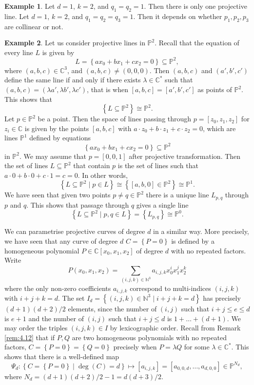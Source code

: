 \documentclass{article}
\newcommand{\N}{\mathbb{N}}
\newcommand{\C}{\mathbb{C}}
\renewcommand{\P}{\mathbb{P}}
\newcommand{\rb}[1]{\left( #1 \right)}
\renewcommand{\sb}[1]{\left[ #1 \right]}
\newcommand{\cb}[1]{\left\{ #1 \right\}}
\theoremstyle{definition}\newtheorem{definition}{Definition}[section]
\theoremstyle{definition}\newtheorem{notation}[definition]{Notation}
\theoremstyle{definition}\newtheorem{remark}[definition]{Remark}
\theoremstyle{definition}\newtheorem{example}[definition]{Example}
\theoremstyle{definition}\newtheorem{fact}{Fact}
\theoremstyle{definition}\newtheorem{exercise}{Exercise}
\begin{document}
\begin{example}
Let $ d = 1 $, $ k = 2 $, and $ q_1 = q_2 = 1 $. Then there is only one projective line. Let $ d = 1 $, $ k = 2 $, and $ q_1 = q_2 = q_3 = 1 $. Then it depends on whether $ p_1, p_2, p_3 $ are collinear or not.
\end{example}

\begin{example}
Let us consider projective lines in $ \P^2 $. Recall that the equation of every line $ L $ is given by
$$ L = \cb{ax_0 + bx_1 + cx_2 = 0} \subseteq \P^2, $$
where $ \rb{a, b, c} \in \C^3 $, and $ \rb{a, b, c} \ne \rb{0, 0, 0} $. Then $ \rb{a, b, c} $ and $ \rb{a', b', c'} $ define the same line if and only if there exists $ \lambda \in \C^* $ such that $ \rb{a, b, c} = \rb{\lambda a', \lambda b', \lambda c'} $, that is when $ \sb{a, b, c} = \sb{a', b', c'} $ as points of $ \P^2 $. This shows that
$$ \cb{L \subseteq \P^2} \cong \P^2. $$
Let $ p \in \P^2 $ be a point. Then the space of lines passing through $ p = \sb{z_0, z_1, z_2} $ for $ z_i \in \C $ is given by the points $ \sb{a, b, c} $ with $ a \cdot z_0 + b \cdot z_1 + c \cdot z_2 = 0 $, which are lines $ \P^1 $ defined by equations
$$ \cb{ax_0 + bx_1 + cx_2 = 0} \subseteq \P^2 $$
in $ \P^2 $. We may assume that $ p = \sb{0, 0, 1} $ after projective transformation. Then the set of lines $ L \subseteq \P^2 $ that contain $ p $ is the set of lines such that $ a \cdot 0 + b \cdot 0 + c \cdot 1 = c = 0 $. In other words,
$$ \cb{L \subseteq \P^2 \mid p \in L} \cong \cb{\sb{a, b, 0} \in \P^2} \cong \P^1. $$
We have seen that given two points $ p \ne q \in \P^2 $ there is a unique line $ L_{p, q} $ through $ p $ and $ q $. This shows that passage through $ q $ gives a single line
$$ \cb{L \subseteq \P^2 \mid p, q \in L} = \cb{L_{p, q}} \cong \P^0. $$
\end{example}

We can parametrise projective curves of degree $ d $ in a similar way. More precisely, we have seen that any curve of degree $ d $ $ C = \cb{P = 0} $ is defined by a homogeneous polynomial $ P \in \C\sb{x_0, x_1, x_2} $ of degree $ d $ with no repeated factors. Write
$$ P\rb{x_0, x_1, x_2} = \sum_{\rb{i, j, k} \in \N^3} a_{i, j, k}x_0^ix_1^jx_2^k $$
where the only non-zero coefficients $ a_{i, j, k} $ correspond to multi-indices $ \rb{i, j, k} $ with $ i + j + k = d $. The set $ I_d = \cb{\rb{i, j, k} \in \N^3 \mid i + j + k = d} $ has precisely $ \rb{d + 1}\rb{d + 2} / 2 $ elements, since the number of $ \rb{i, j} $ such that $ i + j \le e \le d $ is $ e + 1 $ and the number of $ \rb{i, j} $ such that $ i + j \le d $ is $ 1 + \dots + \rb{d + 1} $. We may order the triples $ \rb{i, j, k} \in I $ by lexicographic order. Recall from Remark \ref{rem:4.12} that if $ P, Q $ are two homogeneous polynomials with no repeated factors, $ C = \cb{P = 0} = \cb{Q = 0} $ precisely when $ P = \lambda Q $ for some $ \lambda \in \C^* $. This shows that there is a well-defined map
$$ \Psi_d : \cb{C = \cb{P = 0} \mid \deg\rb{C} = d} \mapsto \sb{a_{i, j, k}} = \sb{a_{0, 0, d}, \dots, a_{d, 0, 0}} \in \P^{N_d}, $$
where $ N_d = \rb{d + 1}\rb{d + 2} / 2 - 1 = d\rb{d + 3} / 2 $.
\end{document}
